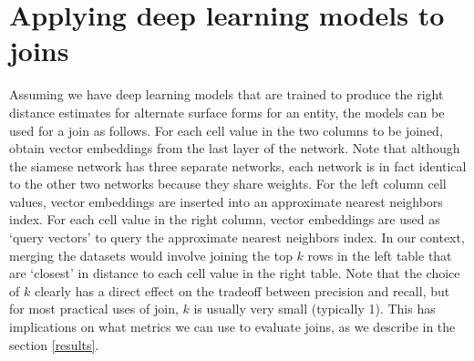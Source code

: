 \section{Applying deep learning models to joins}
\label{join_system}


Assuming we have deep learning models that are trained to produce the right distance estimates for alternate surface forms for an entity, the models can be used for a join as follows.  For each cell value in the two columns to be joined, obtain vector embeddings from the last layer of the network.  Note that although the siamese network has three separate networks, each network is in fact identical to the other two networks because they share weights.  For the left column cell values, vector embeddings are inserted into an approximate nearest neighbors index.  For each cell value in the right column, vector embeddings are used as `query vectors' to query the approximate nearest neighbors index.  In our context, merging the datasets would involve joining the top $k$ rows in the left table that are `closest' in distance to each cell value in the right table.  Note that the choice of $k$ clearly has a direct effect on the tradeoff between precision and recall, but for most practical uses of join, $k$ is usually very small (typically 1).  This has implications on what metrics we can use to evaluate joins, as we describe in the section \ref{results}.

